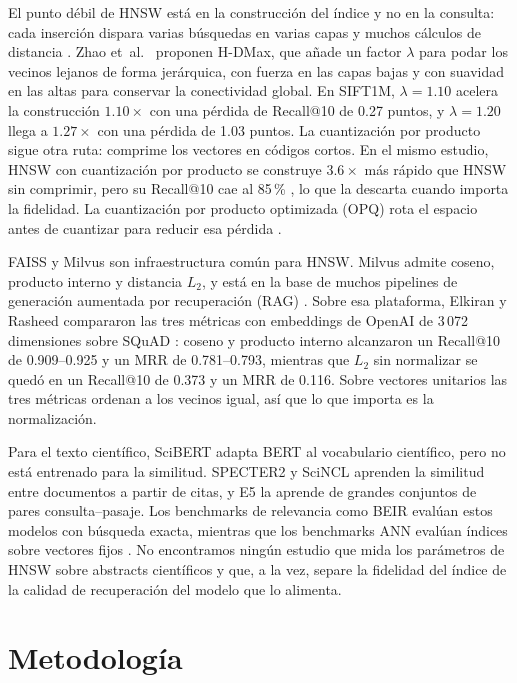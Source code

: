 \documentclass[runningheads]{llncs}
\begin{document}
El punto débil de HNSW está en la construcción del índice y no en la consulta: cada
inserción dispara varias búsquedas en varias capas y muchos cálculos de distancia
\cite{ref9}. Zhao et~al.~\cite{ref9} proponen H-DMax, que añade un factor $\lambda$ para podar
los vecinos lejanos de forma jerárquica, con fuerza en las capas bajas y con suavidad en las
altas para conservar la conectividad global. En SIFT1M, $\lambda=1.10$ acelera la
construcción $1.10\times$ con una pérdida de Recall@10 de 0.27 puntos, y $\lambda=1.20$ llega
a $1.27\times$ con una pérdida de 1.03 puntos. La cuantización por producto \cite{ref15} sigue
otra ruta: comprime los vectores en códigos cortos. En el mismo estudio, HNSW con cuantización
por producto se construye $3.6\times$ más rápido que HNSW sin comprimir, pero su Recall@10 cae
al 85\,\% \cite{ref9}, lo que la descarta cuando importa la fidelidad. La cuantización por
producto optimizada (OPQ) rota el espacio antes de cuantizar para reducir esa pérdida
\cite{ge2014}.

FAISS \cite{ref7} y Milvus \cite{ref8} son infraestructura común para HNSW. Milvus admite
coseno, producto interno y distancia $L_2$, y está en la base de muchos pipelines de
generación aumentada por recuperación (RAG) \cite{ref10}. Sobre esa plataforma, Elkiran y
Rasheed \cite{ref11} compararon las tres métricas con embeddings de OpenAI de 3\,072
dimensiones sobre SQuAD \cite{ref12}: coseno y producto interno alcanzaron un Recall@10 de
0.909--0.925 y un MRR de 0.781--0.793, mientras que $L_2$ sin normalizar se quedó en un
Recall@10 de 0.373 y un MRR de 0.116. Sobre vectores unitarios las tres métricas ordenan a
los vecinos igual, así que lo que importa es la normalización.

Para el texto científico, SciBERT \cite{ref18} adapta BERT \cite{devlin2019} al vocabulario
científico, pero no está entrenado para la similitud. SPECTER2 \cite{singh2023} y SciNCL
\cite{ostendorff2022} aprenden la similitud entre documentos a partir de citas, y E5
\cite{ref19} la aprende de grandes conjuntos de pares consulta--pasaje. Los benchmarks de
relevancia como BEIR \cite{thakur2021} evalúan estos modelos con búsqueda exacta, mientras que
los benchmarks ANN evalúan índices sobre vectores fijos \cite{aumuller2020}. No encontramos
ningún estudio que mida los parámetros de HNSW sobre abstracts científicos y que, a la vez,
separe la fidelidad del índice de la calidad de recuperación del modelo que lo alimenta.

\section{Metodología}
\end{document}
